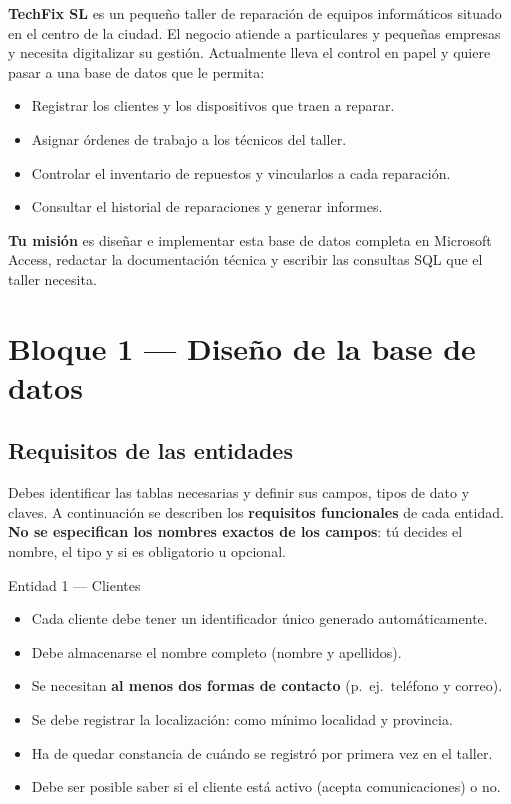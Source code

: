 \documentclass[12pt,a4paper]{article}
\begin{document}
\begin{contextobox}
\textbf{TechFix SL} es un pequeño taller de reparación de equipos informáticos situado en el centro
de la ciudad. El negocio atiende a particulares y pequeñas empresas y necesita digitalizar su gestión.
Actualmente lleva el control en papel y quiere pasar a una base de datos que le permita:

\begin{itemize}
  \item Registrar los clientes y los dispositivos que traen a reparar.
  \item Asignar órdenes de trabajo a los técnicos del taller.
  \item Controlar el inventario de repuestos y vincularlos a cada reparación.
  \item Consultar el historial de reparaciones y generar informes.
\end{itemize}

\textbf{Tu misión} es diseñar e implementar esta base de datos completa en Microsoft Access,
redactar la documentación técnica y escribir las consultas SQL que el taller necesita.
\end{contextobox}

\vspace{0.3cm}

\section{Bloque 1 — Diseño de la base de datos}

\subsection{Requisitos de las entidades}

Debes identificar las tablas necesarias y definir sus campos, tipos de dato y claves.
A continuación se describen los \textbf{requisitos funcionales} de cada entidad.
\textbf{No se especifican los nombres exactos de los campos}: tú decides el nombre, el tipo
y si es obligatorio u opcional.

\vspace{0.3cm}

\begin{tablabox}{Entidad 1 — Clientes}
\begin{itemize}
  \item Cada cliente debe tener un identificador único generado automáticamente.
  \item Debe almacenarse el nombre completo (nombre y apellidos).
  \item Se necesitan \textbf{al menos dos formas de contacto} (p.\ ej.\ teléfono y correo).
  \item Se debe registrar la localización: como mínimo localidad y provincia.
  \item Ha de quedar constancia de cuándo se registró por primera vez en el taller.
  \item Debe ser posible saber si el cliente está activo (acepta comunicaciones) o no.
\end{itemize}
\end{tablabox}
\end{document}
